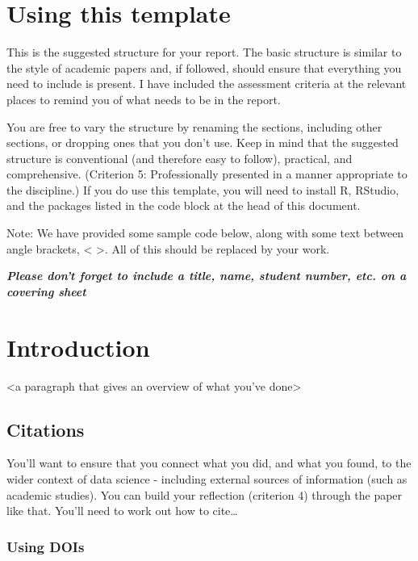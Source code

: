 \documentclass[]{article}
\begin{document}
\hypertarget{using-this-template}{%
\section{Using this template}\label{using-this-template}}

This is the suggested structure for your report. The basic structure is
similar to the style of academic papers and, if followed, should ensure
that everything you need to include is present. I have included the
assessment criteria at the relevant places to remind you of what needs
to be in the report.

You are free to vary the structure by renaming the sections, including
other sections, or dropping ones that you don't use. Keep in mind that
the suggested structure is conventional (and therefore easy to follow),
practical, and comprehensive. (Criterion 5: Professionally presented in
a manner appropriate to the discipline.) If you do use this template,
you will need to install R, RStudio, and the packages listed in the code
block at the head of this document.

Note: We have provided some sample code below, along with some text
between angle brackets, \textless{} \textgreater. All of this should be
replaced by your work.

\textbf{\emph{Please don't forget to include a title, name, student
number, etc. on a covering sheet}}

\hypertarget{introduction}{%
\section{Introduction}\label{introduction}}

\textless a paragraph that gives an overview of what you've
done\textgreater{}

\hypertarget{citations}{%
\subsection{Citations}\label{citations}}

You'll want to ensure that you connect what you did, and what you found,
to the wider context of data science - including external sources of
information (such as academic studies). You can build your reflection
(criterion 4) through the paper like that. You'll need to work out how
to cite\ldots{}

\hypertarget{using-dois}{%
\subsubsection{Using DOIs}\label{using-dois}}
\end{document}
